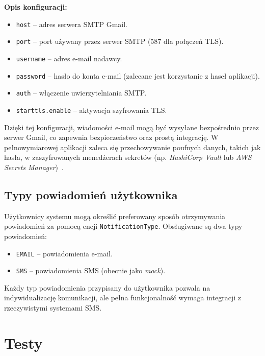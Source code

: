 \textbf{Opis konfiguracji:}
\begin{itemize}
    \item \texttt{host} -- adres serwera SMTP Gmail.
    \item \texttt{port} -- port używany przez serwer SMTP (587 dla połączeń TLS).
    \item \texttt{username} -- adres e-mail nadawcy.
    \item \texttt{password} -- hasło do konta e-mail (zalecane jest korzystanie z haseł aplikacji).
    \item \texttt{auth} -- włączenie uwierzytelniania SMTP.
    \item \texttt{starttls.enable} -- aktywacja szyfrowania TLS.
\end{itemize}

Dzięki tej konfiguracji, wiadomości e-mail mogą być wysyłane bezpośrednio przez serwer Gmail, co zapewnia bezpieczeństwo oraz prostą integrację. W pełnowymiarowej aplikacji zaleca się przechowywanie poufnych danych, takich jak hasła, w zaszyfrowanych menedżerach sekretów 
(np. \emph{HashiCorp Vault} lub \emph{AWS Secrets Manager})~\cite{hashicorp_vault, aws_secret}.


\subsection{Typy powiadomień użytkownika}

Użytkownicy systemu mogą określić preferowany sposób otrzymywania powiadomień za pomocą encji \texttt{NotificationType}. Obsługiwane są dwa typy powiadomień:
\begin{itemize}
    \item \texttt{EMAIL} -- powiadomienia e-mail.
    \item \texttt{SMS} -- powiadomienia SMS (obecnie jako \emph{mock}).
\end{itemize}

Każdy typ powiadomienia przypisany do użytkownika pozwala na indywidualizację komunikacji, ale pełna funkcjonalność wymaga integracji z rzeczywistymi systemami SMS. 


\section{Testy}



